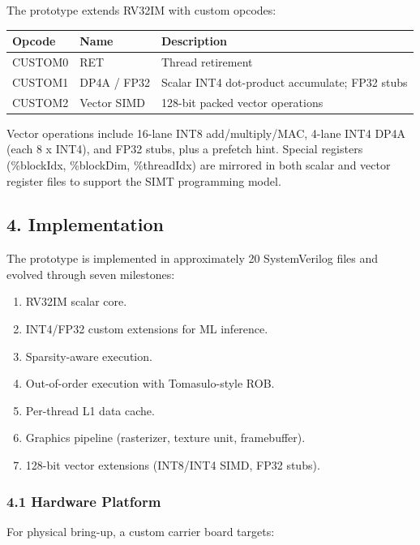 The prototype extends RV32IM with custom opcodes:

\begin{longtable}[]{@{}lll@{}}
\toprule\noalign{}
Opcode & Name & Description \\
\midrule\noalign{}
\endhead
\bottomrule\noalign{}
\endlastfoot
CUSTOM0 & RET & Thread retirement \\
CUSTOM1 & DP4A / FP32 & Scalar INT4 dot-product accumulate; FP32
stubs \\
CUSTOM2 & Vector SIMD & 128-bit packed vector operations \\
\end{longtable}

Vector operations include 16-lane INT8 add/multiply/MAC, 4-lane INT4
DP4A (each 8 x INT4), and FP32 stubs, plus a prefetch hint. Special
registers (\%blockIdx, \%blockDim, \%threadIdx) are mirrored in both
scalar and vector register files to support the SIMT programming model.

\subsection{4. Implementation}\label{4-implementation}

The prototype is implemented in approximately 20 SystemVerilog files and
evolved through seven milestones:

\begin{enumerate}
\def\labelenumi{\arabic{enumi}.}
\tightlist
\item
  RV32IM scalar core.
\item
  INT4/FP32 custom extensions for ML inference.
\item
  Sparsity-aware execution.
\item
  Out-of-order execution with Tomasulo-style ROB.
\item
  Per-thread L1 data cache.
\item
  Graphics pipeline (rasterizer, texture unit, framebuffer).
\item
  128-bit vector extensions (INT8/INT4 SIMD, FP32 stubs).
\end{enumerate}

\subsubsection{4.1 Hardware Platform}\label{41-hardware-platform}

For physical bring-up, a custom carrier board targets:

